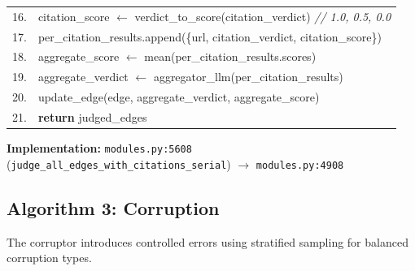 \begin{table}[H]
\begin{tabular}{@{}r l@{}}
16. & \quad\quad citation\_score $\leftarrow$ verdict\_to\_score(citation\_verdict) \hfill\textit{// 1.0, 0.5, 0.0} \\
17. & \quad\quad per\_citation\_results.append(\{url, citation\_verdict, citation\_score\}) \\
18. & \quad aggregate\_score $\leftarrow$ mean(per\_citation\_results.scores) \\
19. & \quad aggregate\_verdict $\leftarrow$ aggregator\_llm(per\_citation\_results) \\
20. & \quad update\_edge(edge, aggregate\_verdict, aggregate\_score) \\
21. & \textbf{return} judged\_edges \\
\bottomrule
\end{tabular}
\end{table}

\textbf{Implementation:} \texttt{modules.py:5608} (\texttt{judge\_all\_edges\_with\_citations\_serial}) $\rightarrow$ \texttt{modules.py:4908}

\subsection{Algorithm 3: Corruption}
\label{alg:corruption}

The corruptor introduces controlled errors using stratified sampling for balanced corruption types.

